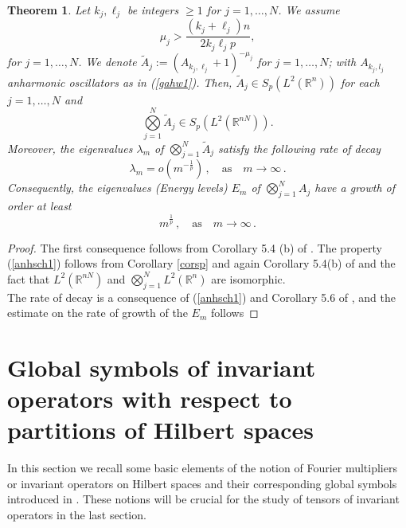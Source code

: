 \documentclass[a4paper,12pt,reqno]{amsart}
\renewcommand\eqref[1]{(\ref{#1})} %
\newtheorem{thm}{Theorem}[section]
\theoremstyle{definition}
\theoremstyle{remark}
\numberwithin{equation}{section}
\newcommand{\beq}{\begin{equation}}
\newcommand{\eq}{\end{equation}}
\def\Rn{{{\mathbb R}^n}}
\begin{document}
\begin{thm} Let $k_j,\ell_j$ be integers $\geq 1$ for $j=1,\dots, N$. We assume
\[\mu_j>\frac{(k_j+\ell_j)n}{2k_j\ell_j p} ,\]
    for  $j=1,\dots, N$. We denote $\widetilde{A}_j:=( A_{k_j,\ell_j}+1)^{-\mu_j}$ for $j=1,\dots, N$; with $A_{k_j,l_j}$ anharmonic oscillators as in \eqref{gahw1}. Then,  $\widetilde{A}_j\in S_p(L^2(\Rn))$ for each  $j=1,\dots, N$ and 
   \beq\label{anhsch1}\bigotimes \limits_{j=1}^N\widetilde{A}_j\in S_p(L^2(\mathbb{R}^{nN})).\eq
Moreover, the eigenvalues $\lambda_m$ of $\bigotimes \limits_{j=1}^N\widetilde{A}_j$ satisfy the following rate of decay
\[
		 \lambda_m=o(m^{-\frac{1}{p}})\,,\quad \text{as} \quad m \rightarrow \infty\, .
		 \]
Consequently, the eigenvalues (Energy levels) $E_m$ of $\bigotimes \limits_{j=1}^N A_j$ have a growth of order  at least 
\[
		m^{\frac{1}{p}}\,,\quad \text{as} \quad m \rightarrow \infty\, .
		 \]
\end{thm}
\begin{proof} The first consequence follows from Corollary 5.4 (b) of \cite{anh:cdr}. The property \eqref{anhsch1} follows from  Corollary \ref{corsp} and again  Corollary 5.4(b) of \cite{anh:cdr} and the fact that $L^2(\mathbb{R}^{nN})$ and $\bigotimes \limits_{j=1}^N L^2(\mathbb{R}^{n})$ are isomorphic.\\

The rate of decay is a consequence of \eqref{anhsch1} and Corollary 5.6 of \cite{anh:cdr}, and the estimate on the rate of growth of the $E_m$ follows
\end{proof}

\section{Global symbols of invariant operators with respect to partitions of Hilbert spaces}\label{sec4}%
In this section we recall some basic elements of the notion of Fourier multipliers or invariant operators on Hilbert spaces and their corresponding global symbols introduced in \cite{fjdmr:foum}. These notions will be crucial for the study of tensors of invariant operators in the last section.\\%
\end{document}
